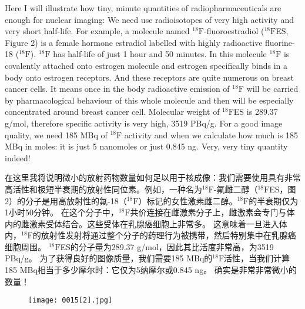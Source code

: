 \documentclass[dvipsnames, svgnames,a4paper,11pt]{article}
\begin{document}
Here I will illustrate how tiny, minute quantities of radiopharmaceuticals are enough for nuclear imaging:
We need use radioisotopes of very high activity and very short half-life. For example, a molecule named ${}^{18}\text{F}$-fluoroestradiol (${}^{18}\text{F}$ES, Figure 2) is a female hormone estradiol labelled with highly radioactive fluorine-18 (${}^{18}\text{F}$). ${}^{18}\text{F}$ has half-life of just 1 hour and 50 minutes.  In this molecule ${}^{18}\text{F}$ is covalently attached onto estrogen molecule and estrogen specifically binds in a body onto estrogen receptors. And these receptors are quite numerous on breast cancer cells.  It means once in the body radioactive emission of ${}^{18}\text{F}$ will be carried by pharmacological behaviour of this whole molecule and then will be especially concentrated around breast cancer cell.  Molecular weight of ${}^{18}\text{F}$ES is 289.37 g/mol, therefore specific activity is very high, 3519 PBq/g.  For a good image quality, we need 185 MBq of ${}^{18}\text{F}$ activity and when we calculate how much is 185 MBq in moles: it is just 5 nanomoles or just 0.845 ng.  Very, very tiny quantity indeed!

在这里我将说明微小的放射药物数量如何足以用于核成像：我们需要使用具有非常高活性和极短半衰期的放射性同位素。例如，一种名为${}^{18}\text{F}$-氟雌二醇（${}^{18}\text{F}$ES，图2）的分子是用高放射性的氟-18（${}^{18}\text{F}$）标记的女性激素雌二醇。${}^{18}\text{F}$的半衰期仅为1小时50分钟。 在这个分子中，${}^{18}\text{F}$共价连接在雌激素分子上，雌激素会专门与体内的雌激素受体结合。这些受体在乳腺癌细胞上非常多。 这意味着一旦进入体内，${}^{18}\text{F}$的放射性发射将通过整个分子的药理行为被携带，然后特别集中在乳腺癌细胞周围。  ${}^{18}\text{F}$ES的分子量为289.37 g/mol，因此其比活度非常高，为3519 PBq/g。  为了获得良好的图像质量，我们需要185 MBq的${}^{18}\text{F}$活性，当我们计算185 MBq相当于多少摩尔时：它仅为5纳摩尔或0.845 ng。 确实是非常非常微小的数量！

\begin{figure}[h]
      \centering
      \texttt{[image: 0015[2].jpg]}
       \label{fig2}
  \end{figure}
\end{document}
